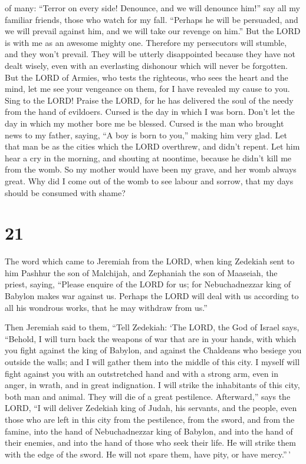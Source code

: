 of many: ``Terror on every side! Denounce, and we will denounce him!''
say all my familiar friends, those who watch for my fall. ``Perhaps he
will be persuaded, and we will prevail against him, and we will take our
revenge on him.''  But the LORD is with me as an awesome
mighty one. Therefore my persecutors will stumble, and they won't
prevail. They will be utterly disappointed because they have not dealt
wisely, even with an everlasting dishonour which will never be
forgotten.  But the LORD of Armies, who tests the
righteous, who sees the heart and the mind, let me see your vengeance on
them, for I have revealed my cause to you.  Sing to the
LORD! Praise the LORD, for he has delivered the soul of the needy from
the hand of evildoers.  Cursed is the day in which I was
born. Don't let the day in which my mother bore me be blessed.
 Cursed is the man who brought news to my father, saying,
``A boy is born to you,'' making him very glad.  Let that
man be as the cities which the LORD overthrew, and didn't repent. Let
him hear a cry in the morning, and shouting at noontime, 
because he didn't kill me from the womb. So my mother would have been my
grave, and her womb always great.  Why did I come out of
the womb to see labour and sorrow, that my days should be consumed with
shame?

\hypertarget{section-20}{%
\section{21}\label{section-20}}

 The word which came to Jeremiah from the LORD, when king
Zedekiah sent to him Pashhur the son of Malchijah, and Zephaniah the son
of Maaseiah, the priest, saying,  ``Please enquire of the
LORD for us; for Nebuchadnezzar king of Babylon makes war against us.
Perhaps the LORD will deal with us according to all his wondrous works,
that he may withdraw from us.''

 Then Jeremiah said to them, ``Tell Zedekiah: 
`The LORD, the God of Israel says, ``Behold, I will turn back the
weapons of war that are in your hands, with which you fight against the
king of Babylon, and against the Chaldeans who besiege you outside the
walls; and I will gather them into the middle of this city. 
I myself will fight against you with an outstretched hand and with a
strong arm, even in anger, in wrath, and in great indignation.
 I will strike the inhabitants of this city, both man and
animal. They will die of a great pestilence.  Afterward,''
says the LORD, ``I will deliver Zedekiah king of Judah, his servants,
and the people, even those who are left in this city from the
pestilence, from the sword, and from the famine, into the hand of
Nebuchadnezzar king of Babylon, and into the hand of their enemies, and
into the hand of those who seek their life. He will strike them with the
edge of the sword. He will not spare them, have pity, or have
mercy.''\,'


